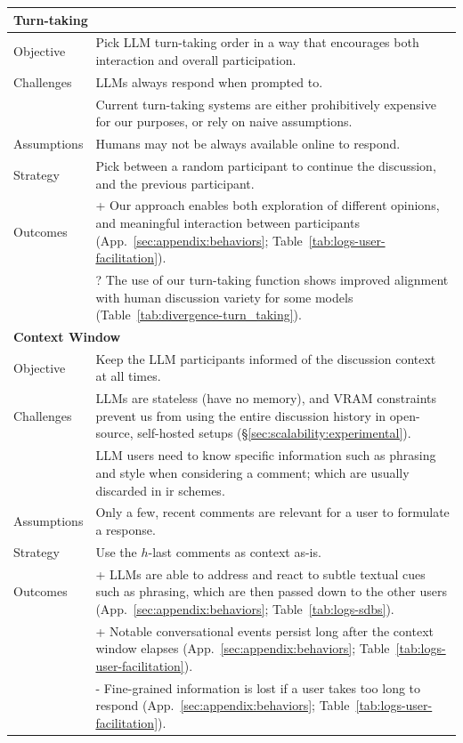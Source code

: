 \begin{longtable}{p{3cm} p{9cm}}
	\midrule
	
	\multicolumn{2}{l}{\textbf{Turn-taking}} \\
	\midrule
	Objective & Pick LLM turn-taking order in a way that encourages both interaction and overall participation. \\
	Challenges & LLMs always respond when prompted to. \\
	& Current turn-taking systems are either prohibitively expensive for our purposes, or rely on naive assumptions. \\
	Assumptions & Humans may not be always available online to respond.  \\
	Strategy & Pick between a random participant to continue the discussion, and the previous participant. \\
	Outcomes & + Our approach enables both exploration of different opinions, and meaningful interaction between participants (App.~\ref{sec:appendix:behaviors}; Table~\ref{tab:logs-user-facilitation}). \\
	& ? The use of our turn-taking function shows improved alignment with human discussion variety for some models (Table~\ref{tab:divergence-turn_taking}). \\
	
	\midrule
	
	\multicolumn{2}{l}{\textbf{Context Window}} \\
	\midrule
	Objective & Keep the LLM participants informed of the discussion context at all times. \\
	Challenges & LLMs are stateless (have no memory), and VRAM constraints prevent us from using the entire discussion history in open-source, self-hosted setups (\S\ref{sec:scalability:experimental}). \\
	& LLM users need to know specific information such as phrasing and style when considering a comment; which are usually discarded in \ac{ir} schemes. \\
	Assumptions & Only a few, recent comments are relevant for a user to formulate a response. \\
	Strategy & Use the $h$-last comments as context as-is. \\
	Outcomes & + LLMs are able to address and react to subtle textual cues such as phrasing, which are then passed down to the other users (App.~\ref{sec:appendix:behaviors}; Table~\ref{tab:logs-sdbs}). \\
	& + Notable conversational events persist long after the context window elapses (App.~\ref{sec:appendix:behaviors}; Table~\ref{tab:logs-user-facilitation}).\\
	& - Fine-grained information is lost if a user takes too long to respond (App.~\ref{sec:appendix:behaviors}; Table~\ref{tab:logs-user-facilitation}). \\
	
\end{longtable}


